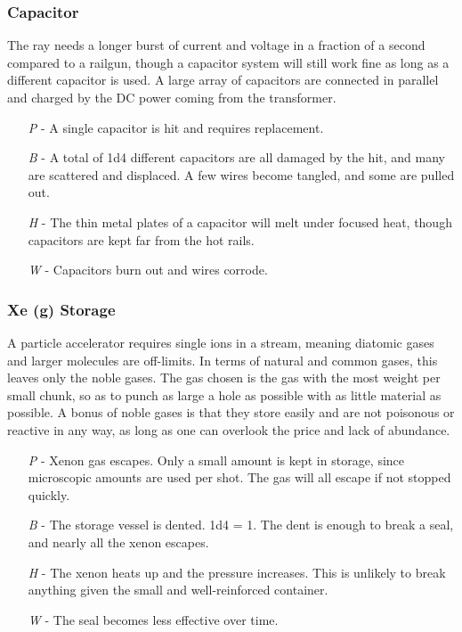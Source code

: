 \documentclass[a4paper]{article}
\begin{document}
\vspace{-0.5cm} \hspace{-18pt} \subsubsection{Capacitor} \label{ray_capacitor} \vspace{-0.2cm}
The ray needs a longer burst of current and voltage in a fraction of a second compared to a railgun, though a capacitor system will still work fine as long as a different capacitor is used. A large array of capacitors are connected in parallel and charged by the DC power coming from the transformer.
\begin{enumerate}
\item [\textit{P}] - A single capacitor is hit and requires replacement.
\item [\textit{B}] - A total of 1d4 different capacitors are all damaged by the hit, and many are scattered and displaced. A few wires become tangled, and some are pulled out.
\item [\textit{H}] - The thin metal plates of a capacitor will melt under focused heat, though capacitors are kept far from the hot rails.
\item [\textit{W}] - Capacitors burn out and wires corrode.
\end{enumerate}

\vspace{-0.5cm} \hspace{-18pt} \subsubsection{Xe (g) Storage} \label{ray_xe_storage} \vspace{-0.2cm}
A particle accelerator requires single ions in a stream, meaning diatomic gases and larger molecules are off-limits. In terms of natural and common gases, this leaves only the noble gases. The gas chosen is the gas with the most weight per small chunk, so as to punch as large a hole as possible with as little material as possible. A bonus of noble gases is that they store easily and are not poisonous or reactive in any way, as long as one can overlook the price and lack of abundance.
\begin{enumerate}
\item [\textit{P}] - Xenon gas escapes. Only a small amount is kept in storage, since microscopic amounts are used per shot. The gas will all escape if not stopped quickly.
\item [\textit{B}] - The storage vessel is dented. \newline \hspace{3pt} 1d4 = 1. The dent is enough to break a seal, and nearly all the xenon escapes.
\item [\textit{H}] - The xenon heats up and the pressure increases. This is unlikely to break anything given the small and well-reinforced container.
\item [\textit{W}] - The seal becomes less effective over time.
\end{enumerate}
\end{document}

